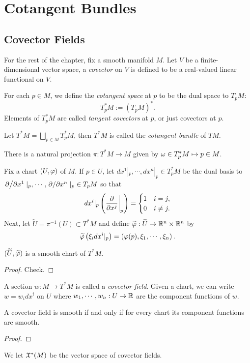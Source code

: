 \section{Cotangent Bundles}
\subsection{Covector Fields}
For the rest of the chapter, fix a smooth manifold $M$.
Let $V$ be a finite-dimensional vector space, a \textit{covector} on $V$ is defined to be a real-valued linear functional on $V$. 
\begin{definition}
    For each $p \in M$, we define the \textit{cotangent space} at $p$ to be the dual space to $T_pM:$
    $$T_p^*M := (T_pM)^*. $$
    Elements of $T_p^*M$ are called \textit{tangent covectors} at $p$, or just covectors at $p$. 
\end{definition}
\begin{definition}
    Let $T^*M = \bigsqcup_{p \in M}T_p^*M$, then $T^*M$ is called the \textit{cotangent bundle} of $TM$.
\end{definition}
There is a natural projection $\pi:T^*M \to M$ given by $\omega \in T_p^*M \mapsto p \in M$. 

Fix a chart $(U,\varphi)$ of $M$. If $p \in U$, let $dx^1|_p, \cdots, dx^n|_p \in T_p^*M$ be the dual basis to $\pdv*{}{x^1}|_p, \cdots, \pdv*{}{x^n}|_p \in T_pM$ so that 
$$ dx^i|_p\left(\pdv{}{x^j}\bigg|_p\right) = \begin{cases}
1 & i=j, \\
0 & i \neq j. \end{cases} $$
Next, let $\widetilde{U} = \pi^{-1}(U) \subset T^*M$ and define $\widetilde{\varphi}:\widetilde{U} \to \mathbb{R}^n \times \mathbb{R}^n$ by 
$$\widetilde{\varphi}\left(\xi_i dx^i|_p\right) = \left(\varphi(p), \xi_1, \cdots, \xi_n\right). $$
\begin{proposition}
    $(\widetilde{U}, \widetilde{\varphi})$ is a smooth chart of $T^*M$. 
\end{proposition}
\begin{proof}
    Check. 
\end{proof}


A section $w:M \to T^*M$ is called a \textit{covector field}. Given a chart, we can write $w = w_i dx^i$ on $U$ where $w_1, \cdots, w_n:U \to \mathbb{R}$ are the component functions of $w$. 
\begin{proposition}\label{11.11}
    A covector field is smooth if and only if for every chart its component functions are smooth. 
\end{proposition}
\begin{proof}
    
\end{proof}
We let $\frak{X}^*(M)$ be the vector space of covector fields. 
